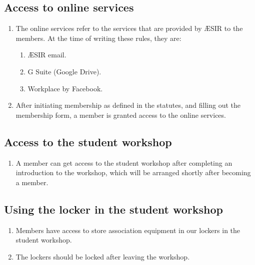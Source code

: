 
\subsection{Access to online services}
\begin{enumerate}
  \item The online services refer to the services that are provided by ÆSIR to the members. At the time of writing these rules, they are:
  \begin{enumerate}
    \item ÆSIR email.
    \item G Suite (Google Drive).
    \item Workplace by Facebook.
  \end{enumerate}
  \item After initiating membership as defined in the statutes, and filling out the membership form, a member is granted access to the online services.
\end{enumerate}

\subsection{Access to the student workshop}
\begin{enumerate}
  \item A member can get access to the student workshop after completing an introduction to the workshop, which will be arranged shortly after becoming a member.
\end{enumerate}

\subsection{Using the locker in the student workshop}
\begin{enumerate}
  \item Members have access to store association equipment in our lockers in the student workshop.
  \item The lockers should be locked after leaving the workshop.
\end{enumerate}
